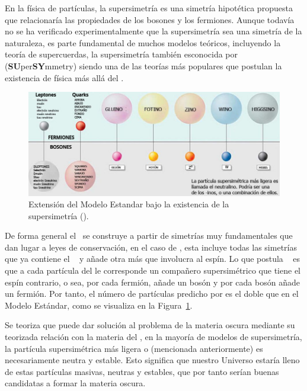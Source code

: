 En la física de partículas, la supersimetría es una simetría hipotética propuesta que relacionaría las propiedades de los bosones y los fermiones. Aunque todavía no se ha verificado experimentalmente que la supersimetría sea una simetría de la naturaleza, es parte fundamental de muchos modelos teóricos, incluyendo la teoría de supercuerdas, la supersimetría también esconocida por \SUSY (\textbf{SU}per\textbf{SY}mmetry) siendo una de las teorías más populares que postulan la existencia de física más allá del \ME. 
\begin{figure}[h!]
\centering
\includegraphics[width=.9\textwidth]{Analisis_y_Resultados/imagenes/supersimetrias.png}
\caption{Extensión del Modelo Estandar bajo la existencia de la supersimetría (\SUSY). %
}
\label{susy}
\end{figure}

De forma general el \ME ~se construye a partir de simetrías muy fundamentales que dan lugar a leyes de conservación, en el caso de \SUSY, esta incluye todas las simetrías que ya contiene el \ME~ y añade otra más que involucra al espín. Lo que postula \SUSY~ es que a cada partícula del \ME le corresponde un compañero supersimétrico que tiene el espín contrario, o sea, por cada fermión, \SUSY añade un bosón y por cada bosón añade un fermión. Por tanto, el número de partículas predicho por \SUSY es el doble que en el Modelo Estándar, como se visualiza en la Figura~\ref{susy}.

Se teoriza que \SUSY puede dar solución al problema de la materia oscura mediante su teorizada relación con la materia del \ME, en la mayoría de modelos de supersimetría, la partícula supersimétrica más ligera o \LSP (mencionada anteriormente) es necesariamente neutra y estable. Esto significa que nuestro Universo estaría lleno de estas partículas masivas, neutras y estables, que por tanto serían buenas candidatas a formar la materia oscura.


